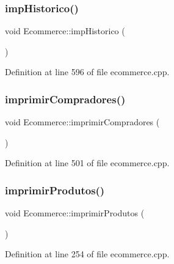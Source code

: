 \subsubsection{\texorpdfstring{imp\+Historico()}{impHistorico()}}
{\footnotesize\ttfamily void Ecommerce\+::imp\+Historico (\begin{DoxyParamCaption}{ }\end{DoxyParamCaption})}



Definition at line 596 of file ecommerce.\+cpp.

\mbox{\label{class_ecommerce_a91971ec96826e6fd06b8a471c1d2f6c6}} 
\subsubsection{\texorpdfstring{imprimir\+Compradores()}{imprimirCompradores()}}
{\footnotesize\ttfamily void Ecommerce\+::imprimir\+Compradores (\begin{DoxyParamCaption}{ }\end{DoxyParamCaption})}



Definition at line 501 of file ecommerce.\+cpp.

\mbox{\label{class_ecommerce_ae6ec7ab9ef6106cd0aaa1501739b3556}} 
\subsubsection{\texorpdfstring{imprimir\+Produtos()}{imprimirProdutos()}}
{\footnotesize\ttfamily void Ecommerce\+::imprimir\+Produtos (\begin{DoxyParamCaption}{ }\end{DoxyParamCaption})}



Definition at line 254 of file ecommerce.\+cpp.

\mbox{\label{class_ecommerce_af6b258758e7486f73d3805838d1a4eda}} 

